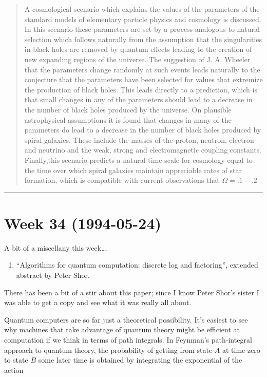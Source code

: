 \documentclass{article}
\def\tightlist{}
\begin{document}
\begin{quote}
A cosmological scenario which explains the values of the parameters of
the standard models of elementary particle physics and cosmology is
discussed. In this scenario these parameters are set by a process
analogous to natural selection which follows naturally from the
assumption that the singularities in black holes are removed by quantum
effects leading to the creation of new expanding regions of the
universe. The suggestion of J. A. Wheeler that the parameters change
randomly at such events leads naturally to the conjecture that the
parameters have been selected for values that extremize the production
of black holes. This leads directly to a prediction, which is that small
changes in any of the parameters should lead to a decrease in the number
of black holes produced by the universe. On plausible astrophysical
assumptions it is found that changes in many of the parameters do lead
to a decrease in the number of black holes produced by spiral galaxies.
These include the masses of the proton, neutron, electron and neutrino
and the weak, strong and electromagnetic coupling constants.
Finally,this scenario predicts a natural time scale for cosmology equal
to the time over which spiral galaxies maintain appreciable rates of
star formation, which is compatible with current observations that
\(\Omega = .1-.2\)
\end{quote}

\begin{center}\rule{0.5\linewidth}{0.5pt}\end{center}
\hypertarget{week-34-1994-05-24}{%
\section{Week 34 (1994-05-24)}\label{week-34-1994-05-24}}

A bit of a miscellany this week\ldots.

\begin{enumerate}
\def\labelenumi{\arabic{enumi})}
\tightlist
\item
  ``Algorithms for quantum computation: discrete log and factoring'',
  extended abstract by Peter Shor.
\end{enumerate}

There has been a bit of a stir about this paper; since I know Peter
Shor's sister I was able to get a copy and see what it was really all
about.

Quantum computers are so far just a theoretical possibility. It's
easiest to see why machines that take advantage of quantum theory might
be efficient at computation if we think in terms of path integrals. In
Feynman's path-integral approach to quantum theory, the probability of
getting from state \(A\) at time zero to state \(B\) some later time is
obtained by integrating the exponential of the action
\end{document}

